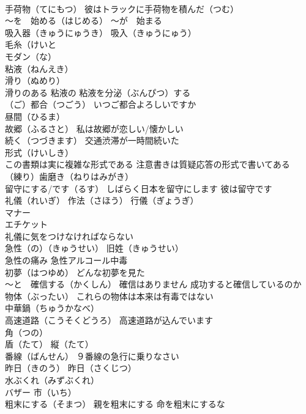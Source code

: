 \documentclass[8pt]{extreport}
\begin{document}
\begin{CJK}{UTF8}{min}
\\	手荷物（てにもつ） 彼はトラックに手荷物を積んだ（つむ）
\\	～を　始める（はじめる） ～が　始まる
\\	吸入器（きゅうにゅうき） 吸入（きゅうにゅう）
\\	毛糸（けいと
\\	モダン（な）
\\	粘液（ねんえき）
\\	滑り（ぬめり）
\\	滑りのある 粘液の 粘液を分泌（ぶんぴつ）する
\\	（ご）都合（つごう） いつご都合よろしいですか
\\	昼間（ひるま）
\\	故郷（ふるさと） 私は故郷が恋しい/懐かしい
\\	続く（つづきます） 交通渋滞が一時間続いた
\\	形式（けいしき） 
\\	この書類は実に複雑な形式である 注意書きは質疑応答の形式で書いてある
\\	（練り）歯磨き（ねりはみがき）
\\	留守にする/です（るす） しばらく日本を留守にします 彼は留守です
\\	礼儀（れいぎ） 作法（さほう） 行儀（ぎょうぎ） 
\\	マナー 
\\	エチケット 
\\	礼儀に気をつけなければならない
\\	急性（の）（きゅうせい） 旧姓（きゅうせい）
\\	急性の痛み 急性アルコール中毒
\\	初夢（はつゆめ） どんな初夢を見た
\\	～と　確信する（かくしん） 確信はありません 成功すると確信しているのか
\\	物体（ぶったい） これらの物体は本来は有毒ではない
\\	中華鍋（ちゅうかなべ）
\\	高速道路（こうそくどうろ） 高速道路が込んでいます
\\	角（つの）
\\	盾（たて） 縦（たて）
\\	番線（ばんせん） ９番線の急行に乗りなさい
\\	昨日（きのう） 昨日（さくじつ）
\\	水ぶくれ（みずぶくれ）
\\	バザー 市（いち）
\\	粗末にする（そまつ） 親を粗末にする 命を粗末にするな

\end{CJK}
\end{document}
